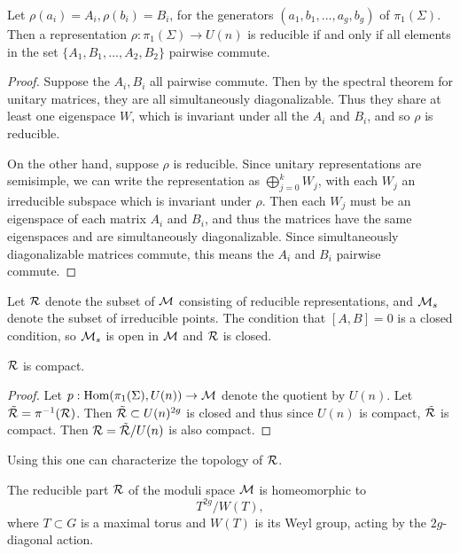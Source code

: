 	\begin{lemma}
		\label{l:irrep-lemma}
		Let $\rho(a_i) = A_i, \rho(b_i) = B_i$, for the generators $(a_1,b_1,...,a_g,b_g)$ of $\pi_1(\Sigma)$. Then a representation $\rho:\pi_1(\Sigma) \to U(n)$ is reducible if and only if all elements in the set $\{A_1,B_1,...,A_2,B_2\}$ pairwise commute.
	\end{lemma}
	\begin{proof}
		Suppose the $A_i,B_i$ all pairwise commute. Then by the spectral theorem for unitary matrices, they are all simultaneously diagonalizable. Thus they share at least one eigenspace $W$, which is invariant under all the $A_i$ and $B_i$, and so $\rho$ is reducible.
		
		On the other hand, suppose $\rho$ is reducible. Since unitary representations are semisimple, we can write the representation as $\bigoplus_{j=0}^k W_j$, with each $W_j$ an irreducible subspace which is invariant under $\rho$. Then each $W_j$ must be an eigenspace of each matrix $A_i$ and $B_i$, and thus the matrices have the same eigenspaces and are simultaneously diagonalizable. Since simultaneously diagonalizable matrices commute, this means the $A_i$ and $B_i$ pairwise commute. 
	\end{proof}
	Let $\mathcal{R}$ denote the subset of $\mathcal{M}$ consisting of reducible representations, and $\mathcal{M}_s$ denote the subset of irreducible points. The condition that $[A,B] =0$ is a closed condition, so $\mathcal{M}_s$ is open in $\mathcal{M}$ and $\mathcal{R}$ is closed.
	\begin{lemma}
		$\mathcal{R}$ is compact.
	\end{lemma}
	\begin{proof}
		Let $p:\text{Hom}(\pi_1(\Sigma),U(n))\to \mathcal{M}$ denote the quotient by $U(n)$. Let $\tilde{\mathcal{R}} = \pi^{-1}(\mathcal{R})$. Then $\tilde{\mathcal{R}} \subset U(n)^{2g}$ is closed and thus since $U(n)$ is compact, $\tilde{\mathcal{R}}$ is compact. Then $\mathcal{R} = \tilde{\mathcal{R}}/U(n)$ is also compact.
	\end{proof}
	Using this one can characterize the topology of $\mathcal{R}$.
	\begin{theorem}
		\label{t:reducibletorus}
		The reducible part $\mathcal{R}$ of the moduli space $\mathcal{M}$ is homeomorphic to
		\begin{equation}
			T^{2g}/W(T),
		\end{equation}
		where $T\subset G$ is a maximal torus and $W(T)$ is its Weyl group, acting by the $2g$-diagonal action.
	\end{theorem}
